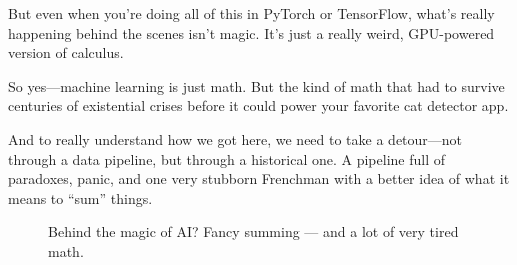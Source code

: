 But even when you’re doing all of this in PyTorch or TensorFlow, what’s really happening behind the scenes isn’t magic. It’s just a really weird, GPU-powered version of calculus.

So yes—machine learning is just math. But the kind of math that had to survive centuries of existential crises before it could power your favorite cat detector app.

And to really understand how we got here, we need to take a detour—not through a data pipeline, but through a historical one. A pipeline full of paradoxes, panic, and one very stubborn Frenchman with a better idea of what it means to “sum” things.



\begin{figure}[H]
\centering
{}
\caption{Behind the magic of AI? Fancy summing — and a lot of very tired math.}
\end{figure}